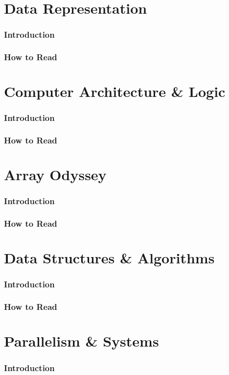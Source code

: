 \documentclass[12pt, oneside, openany]{book}
\begin{document}
\part{Data Representation}
\section*{Introduction}
\section*{How to Read}
\part{Computer Architecture \& Logic}
\section*{Introduction}
\section*{How to Read}
\part{Array Odyssey}
\section*{Introduction}
\section*{How to Read}
\part{Data Structures \& Algorithms}
\section*{Introduction}
\section*{How to Read}
\part{Parallelism \& Systems}
\section*{Introduction}
\end{document}
